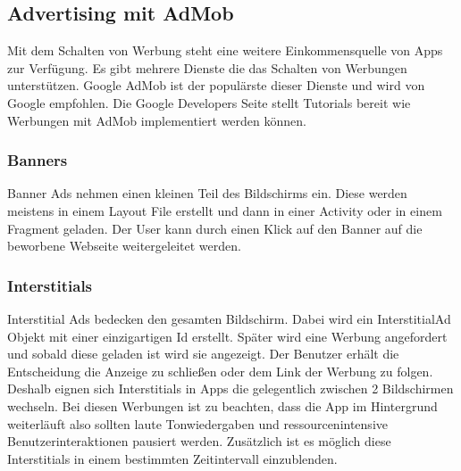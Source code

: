 \documentclass[FIPLY_base.tex]{subfiles}
\author{Andreas Denkmayr}
\date{25. Februar 2016}
\begin{document}
\subsection{Advertising mit AdMob}
Mit dem Schalten von Werbung steht eine weitere Einkommensquelle von Apps zur Verfügung.
Es gibt mehrere Dienste die das Schalten von Werbungen unterstützen.
Google AdMob ist der populärste dieser Dienste und wird von Google empfohlen.
Die Google Developers Seite stellt Tutorials bereit wie Werbungen mit AdMob implementiert werden können.

\subsubsection{Banners}
Banner Ads nehmen einen kleinen Teil des Bildschirms ein. Diese werden meistens in einem Layout File erstellt und dann in einer Activity oder in einem Fragment geladen. Der User kann durch einen Klick auf den Banner auf die beworbene Webseite weitergeleitet werden.

\subsubsection{Interstitials}
Interstitial Ads bedecken den gesamten Bildschirm. 
Dabei wird ein InterstitialAd Objekt mit einer einzigartigen Id erstellt. Später wird eine Werbung angefordert und sobald diese geladen ist wird sie angezeigt. Der Benutzer erhält die Entscheidung die Anzeige zu schließen oder dem Link der Werbung zu folgen. Deshalb eignen sich Interstitials in Apps die gelegentlich zwischen 2 Bildschirmen wechseln.
Bei diesen Werbungen ist zu beachten, dass die App im Hintergrund weiterläuft also sollten laute Tonwiedergaben und ressourcenintensive Benutzerinteraktionen pausiert werden. Zusätzlich ist es möglich diese Interstitials in einem bestimmten Zeitintervall einzublenden.
\end{document}
